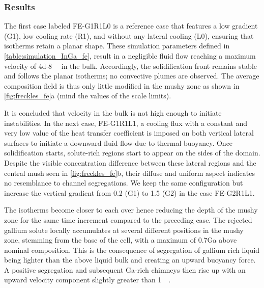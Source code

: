 \subsubsection{Results}

The first case labeled FE-G1R1L0 is a reference case that features a low gradient (G1), low cooling rate (R1), 
and without any lateral cooling (L0), ensuring that isotherms retain a planar shape. These simulation parameters 
defined in \cref{table:simulation_InGa_fe}, result in a negligible fluid flow reaching a maximum velocity of \SI{4d-8}{\milli\uvelocity} in the bulk. 
Accordingly, the solidification front remains stable and follows the planar isotherms; no convective plumes are observed. 
The average composition field is thus only little modified in the mushy zone as shown in \cref{fig:freckles_fe}a (mind the values of the scale limits). 

It is concluded that velocity in the bulk is not high enough to initiate instabilities. In the next case, FE-G1R1L1, 
a cooling flux with a constant and very low value of the heat transfer coefficient is imposed on both vertical lateral 
surfaces to initiate a downward fluid flow due to thermal buoyancy. Once solidification starts, solute-rich regions start 
to appear on the sides of the domain. Despite the visible concentration difference between these lateral regions and 
the central mush seen in \cref{fig:freckles_fe}b, their diffuse and uniform aspect indicates no resemblance to channel segregations. We keep the 
same configuration but increase the vertical gradient from \SI{0.2}{\ugradT} (G1) to \SI{1.5}{\ugradT} (G2) in the case FE-G2R1L1. 

The isotherms become closer to each over hence reducing the depth of the mushy zone for the same time increment compared 
to the preceding case. The rejected gallium solute locally accumulates at several different positions in the mushy zone, 
stemming from the base of the cell, with a maximum of \SI{0.7}{\ucomposition}Ga above nominal composition. 
This is the consequence of segregation of gallium rich liquid being lighter than the above liquid bulk and creating an 
upward buoyancy force. A positive segregation and subsequent Ga-rich chimneys then rise up with an upward velocity 
component slightly greater than \SI{1}{\milli\uvelocity}.

